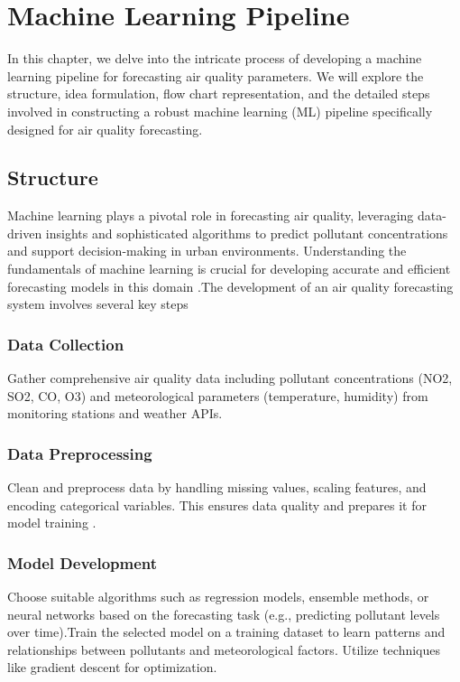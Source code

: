 %
%
%

\chapter{Machine Learning Pipeline}

In this chapter, we delve into the intricate process of developing a machine learning pipeline for forecasting air quality parameters. We will explore the structure, idea formulation, flow chart representation, and the detailed steps involved in constructing a robust machine learning (ML) pipeline specifically designed for air quality forecasting.
\section{Structure} 
Machine learning plays a pivotal role in forecasting air quality, leveraging data-driven insights and sophisticated algorithms to predict pollutant concentrations and support decision-making in urban environments. Understanding the fundamentals of machine learning is crucial for developing accurate and efficient forecasting models in this domain \cite{Fan:2019}.The development of an air quality forecasting system involves several key steps 
\subsection {Data Collection}
 Gather comprehensive air quality data including pollutant concentrations (NO2, SO2, CO, O3) and meteorological parameters (temperature, humidity) from monitoring stations and weather APIs.\cite{Fan:2019}
\subsection {Data Preprocessing}
Clean and preprocess data by handling missing values, scaling features, and encoding categorical variables. This ensures data quality and prepares it for model training \cite{GeeksforGeeks:2024}.
\subsection {Model Development}
 Choose suitable algorithms such as regression models, ensemble methods, or neural networks based on the forecasting task (e.g., predicting pollutant levels over time).Train the selected model on a training dataset to learn patterns and relationships between pollutants and meteorological factors. Utilize techniques like gradient descent for optimization\cite{GeeksforGeeks:2024}.
